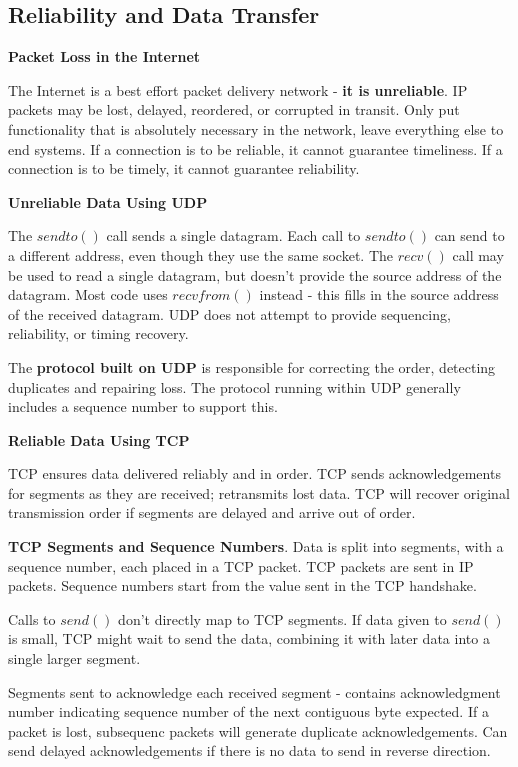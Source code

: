 \documentclass{article}
\begin{document}
\subsection*{Reliability and Data Transfer}

\textbf{Packet Loss in the Internet}

The Internet is a best effort packet delivery network {-} \textbf{it is unreliable}.
IP packets may be lost, delayed, reordered, or corrupted in transit.
Only put functionality that is absolutely necessary in the network, leave everything else to end systems.
If a connection is to be reliable, it cannot guarantee timeliness.
If a connection is to be timely, it cannot guarantee reliability.

\vspace{\baselineskip}
\textbf{Unreliable Data Using UDP}

The $sendto()$ call sends a single datagram.
Each call to $sendto()$ can send to a different address, even though they use the same socket.
The $recv()$ call may be used to read a single datagram, but doesn't provide the source address of the datagram.
Most code uses $recvfrom()$ instead {-} this fills in the source address of the received datagram.
UDP does not attempt to provide sequencing, reliability, or timing recovery.

The \textbf{protocol built on UDP} is responsible for correcting the order, detecting duplicates and repairing loss.
The protocol running within UDP generally includes a sequence number to support this.

\vspace{\baselineskip}
\textbf{Reliable Data Using TCP}

TCP ensures data delivered reliably and in order.
TCP sends acknowledgements for segments as they are received; retransmits lost data.
TCP will recover original transmission order if segments are delayed and arrive out of order.

\textbf{TCP Segments and Sequence Numbers}. Data is split into segments, with a sequence number, each placed in a TCP packet.
TCP packets are sent in IP packets.
Sequence numbers start from the value sent in the TCP handshake.

Calls to $send()$ don't directly map to TCP segments.
If data given to $send()$ is small, TCP might wait to send the data, combining it with later data into a single larger segment.

Segments sent to acknowledge each received segment {-} contains acknowledgment number indicating sequence number of the next
contiguous byte expected.
If a packet is lost, subsequenc packets will generate duplicate acknowledgements.
Can send delayed acknowledgements if there is no data to send in reverse direction.
\end{document}
